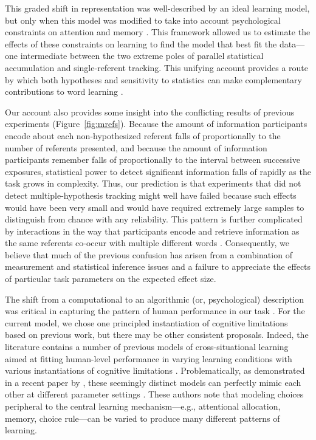 \documentclass[authoryear,review]{elsarticle}
\begin{document}
This graded shift in representation was well-described by an ideal learning model, but only when this model was modified to take into account psychological constraints on attention and memory \citep{Kachergis2012,Vlach2013,Yurovsky2014}. This framework allowed us to estimate the effects of these constraints on learning to find the model that best fit the data---one intermediate between the two extreme poles of parallel statistical accumulation and single-referent tracking. This unifying account provides a route by which both hypotheses and sensitivity to statistics can make complementary contributions to word learning \citep{Waxman2009,Kachergis2013}. 

Our account also provides some insight into the conflicting results of previous experiments (Figure~\ref{fig:mrefs}). Because the amount of information participants encode about each non-hypothesized referent falls of proportionally to the number of referents presented, and because the amount of information participants remember falls of proportionally to the interval between successive exposures, statistical power to detect significant information falls of rapidly as the task grows in complexity. Thus, our prediction is that experiments that did not detect multiple-hypothesis tracking might well have failed because such effects would have been very small and would have required extremely large samples to distinguish from chance with any reliability. This pattern is further complicated by interactions in the way that participants encode and retrieve information as the same referents co-occur with multiple different words \citep{Yurovsky2013, Yurovsky2014}. Consequently, we believe that much of the previous confusion has arisen from a combination of measurement and statistical inference issues and a failure to appreciate the effects of particular task parameters on the expected effect size.

The shift from a computational to an algorithmic (or, psychological) description was critical in capturing the pattern of human performance in our task \citep{Marr1982,Frank2010a,Yurovsky2012c}. For the current model, we chose one principled instantiation of cognitive limitations based on previous work, but there may be other consistent proposals. Indeed, the literature contains a number of previous models of cross-situational learning aimed at fitting human-level performance in varying learning conditions with various instantiations of cognitive limitations \citep[e.g.,][]{fazly2010,Smith2011a,tilles2013,Kachergis2012,Yurovsky2014}. Problematically, as demonstrated in a recent paper by \citet{Yu2012b}, these seemingly distinct models can perfectly mimic each other at different parameter settings \citep[see also,][]{Townsend1990}. These authors note that modeling choices peripheral to the central learning mechanism---e.g., attentional allocation, memory, choice rule---can be varied to produce many different patterns of learning. 
\end{document}
